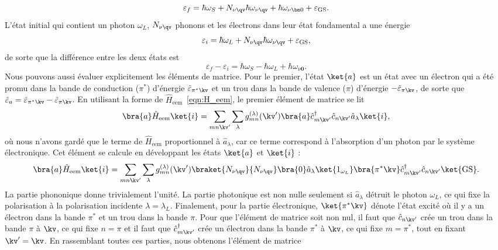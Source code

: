 \begin{equation}
    \varepsilon_f = \hbar\omega_S + N_{\nu\qv}\hbar\omega_{\nu\qv} +\hbar\omega_{\nu\bm 0}+ \varepsilon_\text{GS}.
\end{equation}
L'état initial qui contient un photon $\omega_L$, $N_{\nu\qv}$ phonons et les électrons dans leur état fondamental a une énergie
\begin{equation}
    \varepsilon_i =\hbar\omega_L+N_{\nu\qv}\hbar\omega_{\nu\qv} +\varepsilon_\text{GS},
\end{equation}
de sorte que la différence entre les deux états est
\begin{equation}
    \varepsilon_f-\varepsilon_i = \hbar\omega_S - \hbar\omega_L +\hbar\omega_{\nu\bm 0}.
\end{equation}
Nous pouvons aussi évaluer explicitement les éléments de matrice. Pour le premier, l'état $\ket{a}$ est un état avec un électron qui a été promu dans la bande de conduction ($\pi^*$) d'énergie $\tilde{\varepsilon}_{\pi^*\kv}$ et un trou dans la bande de valence ($\pi$) d'énergie $-\tilde{\varepsilon}_{\pi\kv}$, de sorte que $\tilde{\varepsilon}_{a}=\tilde{\varepsilon}_{\pi^*\kv}-\tilde{\varepsilon}_{\pi\kv}$. En utilisant la forme de $\hat{H}_\text{eem}$~\eqref{eqn:H_eem}, le premier élément de matrice se lit
\begin{equation}
    \bra{a}\hat{H}_\text{eem}\ket{i} = \sum_{mn\kv'}\sum_{\lambda}g_{mn}^{(\lambda)}(\kv')\bra{a}\hat{c}^\dag_{m\kv'}\hat{c}_{n\kv'}\hat{a}_\lambda\ket{i},
\end{equation}
où nous n'avons gardé que le terme de $\hat{H}_\text{eem}$ proportionnel à $\hat{a}_\lambda$, car ce terme correspond à l'absorption d'un photon par le système électronique. Cet élément se calcule en développant les états $\ket{a}$ et $\ket{i}$ :
\begin{equation}
    \bra{a}\hat{H}_\text{eem}\ket{i} = \sum_{mn\kv'}\sum_{\lambda}g_{mn}^{(\lambda)}(\kv')\braket{N_{\nu\qv}}{N_{\nu\qv}}\bra{0}\hat{a}_{\lambda}\ket{1_{\omega_L}}\bra{\pi^*\kv}\hat{c}_{m\kv'}^\dag\hat{c}_{n\kv'}\ket{\text{GS}}.
\end{equation}
La partie phononique donne trivialement l'unité. La partie photonique est non nulle seulement si $\hat{a}_\lambda$ détruit le photon $\omega_L$, ce qui fixe la polarisation à la polarisation incidente $\lambda=\lambda_L$. Finalement, pour la partie électronique, $\ket{\pi^*\kv}$ dénote l'état excité où il y a un électron dans la bande $\pi^*$ et un trou dans la bande $\pi$. Pour que l'élément de matrice soit non nul, il faut que $\hat{c}_{n\kv'}$ crée un trou dans la bande $\pi$ à $\kv$, ce qui fixe $n=\pi$ et il faut que $\hat{c}_{m\kv'}^\dag$ crée un électron dans la bande $\pi^*$ à $\kv$, ce qui fixe $m=\pi^*$, tout en fixant $\kv'=\kv$. En rassemblant toutes ces parties, nous obtenons l'élément de matrice
